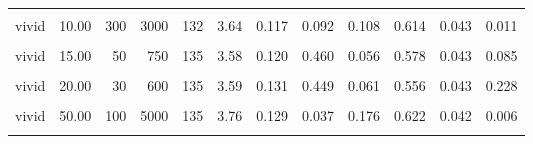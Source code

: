 \documentclass[
]{article}
\begin{document}
\begin{longtable}[t]{lrrrrrrlrrrl}
\hspace{1em}\cellcolor{gray!10}{vivid} & \cellcolor{gray!10}{10.00} & \cellcolor{gray!10}{40} & \cellcolor{gray!10}{400} & \cellcolor{gray!10}{135} & \cellcolor{gray!10}{3.56} & \cellcolor{gray!10}{0.132} & \cellcolor{gray!10}{0.564} & \cellcolor{gray!10}{0.036} & \cellcolor{gray!10}{0.578} & \cellcolor{gray!10}{0.043} & \cellcolor{gray!10}{0.085}\\
\hspace{1em}vivid & 10.00 & 300 & 3000 & 132 & 3.64 & 0.117 & 0.092 & 0.108 & 0.614 & 0.043 & 0.011\\
\hspace{1em}\cellcolor{gray!10}{vivid} & \cellcolor{gray!10}{15.00} & \cellcolor{gray!10}{20} & \cellcolor{gray!10}{300} & \cellcolor{gray!10}{132} & \cellcolor{gray!10}{3.78} & \cellcolor{gray!10}{0.121} & \cellcolor{gray!10}{0.011} & \cellcolor{gray!10}{0.203} & \cellcolor{gray!10}{0.621} & \cellcolor{gray!10}{0.043} & \cellcolor{gray!10}{0.007}\\
\hspace{1em}vivid & 15.00 & 50 & 750 & 135 & 3.58 & 0.120 & 0.460 & 0.056 & 0.578 & 0.043 & 0.085\\
\hspace{1em}\cellcolor{gray!10}{vivid} & \cellcolor{gray!10}{20.00} & \cellcolor{gray!10}{10} & \cellcolor{gray!10}{200} & \cellcolor{gray!10}{132} & \cellcolor{gray!10}{4.00} & \cellcolor{gray!10}{0.126} & \cellcolor{gray!10}{<0.001} & \cellcolor{gray!10}{0.346} & \cellcolor{gray!10}{0.652} & \cellcolor{gray!10}{0.042} & \cellcolor{gray!10}{<0.001}\\
\hspace{1em}vivid & 20.00 & 30 & 600 & 135 & 3.59 & 0.131 & 0.449 & 0.061 & 0.556 & 0.043 & 0.228\\
\hspace{1em}\cellcolor{gray!10}{vivid} & \cellcolor{gray!10}{50.00} & \cellcolor{gray!10}{10} & \cellcolor{gray!10}{500} & \cellcolor{gray!10}{132} & \cellcolor{gray!10}{4.14} & \cellcolor{gray!10}{0.130} & \cellcolor{gray!10}{<0.001} & \cellcolor{gray!10}{0.433} & \cellcolor{gray!10}{0.735} & \cellcolor{gray!10}{0.039} & \cellcolor{gray!10}{<0.001}\\
\hspace{1em}vivid & 50.00 & 100 & 5000 & 135 & 3.76 & 0.129 & 0.037 & 0.176 & 0.622 & 0.042 & 0.006\\
\hspace{1em}\cellcolor{gray!10}{vivid} & \cellcolor{gray!10}{100.00} & \cellcolor{gray!10}{30} & \cellcolor{gray!10}{3000} & \cellcolor{gray!10}{132} & \cellcolor{gray!10}{4.21} & \cellcolor{gray!10}{0.125} & \cellcolor{gray!10}{<0.001} & \cellcolor{gray!10}{0.491} & \cellcolor{gray!10}{0.735} & \cellcolor{gray!10}{0.039} & \cellcolor{gray!10}{<0.001}\\

\end{longtable}
\end{document}
